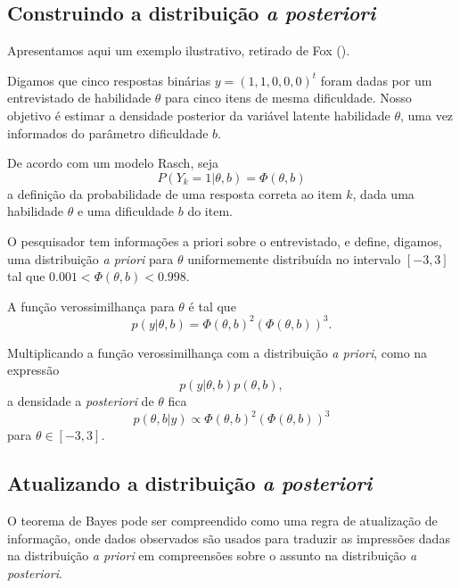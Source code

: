 \documentclass[
	12pt,				%
	openright,			%
	twoside,			%
	a4paper,			%
	english,			%
	brazil				%
	]{abntex2}
\begin{document}
 \subsection{Construindo a distribuição \emph{a posteriori}}
 Apresentamos aqui um exemplo ilustrativo, retirado de Fox (\citeyear{fox2010}).

 Digamos que cinco respostas binárias $y = (1, 1, 0, 0, 0)^{t}$ foram dadas por um entrevistado de habilidade $\theta$ para cinco itens de mesma dificuldade. Nosso objetivo é estimar a densidade posterior da variável latente habilidade $\theta$, uma vez informados do parâmetro dificuldade $b$. 

 De acordo com um modelo Rasch, seja 
 \begin{equation*}
     P(Y_{k} = 1|\theta, b) = \Phi(\theta, b)
 \end{equation*}
 a definição da probabilidade de uma resposta correta ao item $k$, dada uma habilidade $\theta$ e uma dificuldade $b$ do item.

 O pesquisador tem informações a priori sobre o entrevistado, e define, digamos, uma distribuição \emph{a priori} para $\theta$ uniformemente distribuída no intervalo $[-3, 3]$ tal que $0.001 < \Phi(\theta, b) < 0.998$.

 A função verossimilhança para $\theta$ é tal que
 \begin{equation*}
     p(y|\theta, b) = \Phi(\theta, b)^{2}(\Phi(\theta, b))^{3}.
 \end{equation*}

 Multiplicando a função verossimilhança com a distribuição \emph{a priori}, como na expressão
 \begin{equation*}
     p(y|\theta, b)p(\theta, b),
 \end{equation*}
 a densidade a \textit{posteriori} de $\theta$ fica
 \begin{equation*}
     p(\theta, b|y) \propto \Phi(\theta, b)^{2}(\Phi(\theta, b))^{3}
 \end{equation*}
 para $\theta \in [-3, 3]$. 
 
 \subsection{Atualizando a distribuição \emph{a posteriori}}
 O teorema de Bayes pode ser compreendido como uma regra de atualização de informação, onde dados observados são usados para traduzir as impressões dadas na distribuição \emph{a priori} em compreensões sobre o assunto na distribuição \emph{a posteriori}. 
\end{document}
